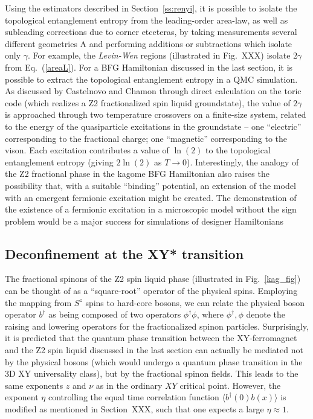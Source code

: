 \documentclass[range]{ar2e}
\begin{document}
Using the estimators described in Section~\ref{ss:renyi}, it is possible to isolate the topological entanglement entropy from the leading-order area-law, as well as subleading corrections due to corner etceteras, by taking measurements several different geometries A and performing additions or subtractions which isolate only $\gamma$.  For example, the {\it Levin-Wen} regions (illustrated in Fig.~XXX) isolate $2\gamma$ from Eq.~(\ref{areaL}).  For a BFG Hamiltonian discussed in the last section, it is possible to extract the topological entanglement entropy in a QMC simulation.  As discussed by Castelnovo and Chamon through direct calculation on the toric code (which realizes a Z2 fractionalized spin liquid groundstate), the value of $2\gamma$ is approached through two temperature crossovers on a finite-size system, related to the energy of the quasiparticle excitations in the groundstate -- one ``electric'' corresponding to the fractional charge; one ``magnetic'' corresponding to the vison.  Each excitation contributes a value of $\ln(2)$ to the topological entanglement entropy (giving $2\ln(2)$ as $T \rightarrow 0$).  Interestingly, the analogy of the Z2 fractional phase in the kagome BFG Hamiltonian also raises the possibility that, with a suitable ``binding'' potential, an extension of the model with an emergent fermionic excitation might be created.  The demonstration of the existence of a fermionic excitation in a microscopic model without the sign problem would be a major success for simulations of designer Hamiltonians

\subsection{Deconfinement at the XY* transition} \label{XYstar}

The fractional spinons of the Z2 spin liquid phase (illustrated in Fig.~\ref{kag_fig}) can be thought of as a ``square-root'' operator of the physical spins.  Employing the mapping from $S^z$ spins to hard-core bosons, we can relate the physical boson operator $b^{\dagger}$ as being composed of two operators  $\phi^\dagger \phi$, where $\phi^\dagger,\phi$ denote the raising and lowering operators for the fractionalized spinon particles.  
Surprisingly, it is predicted that the quantum phase transition between the XY-ferromagnet and the Z2 spin liquid discussed in the last section can actually be mediated not by the physical bosons (which would undergo a quantum phase transition in the 3D XY universality class), but by the fractional spinon fields.\cite{XYstar1,XYstar2,earlyXYstar}  This leads to the same exponents $z$ and $\nu$ as in the ordinary $XY$ critical point.  However, the exponent $\eta$ controlling the equal time correlation function $\langle b^\dagger(0) b(x) \rangle$ is modified as mentioned in Section~XXX, such that one expects a large $\eta \approx 1$.
\end{document}
